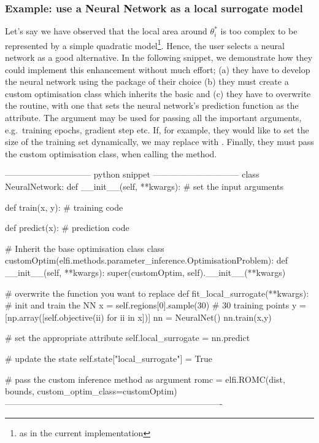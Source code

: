 \subsubsection*{Example: use a Neural Network as a local surrogate model}

Let's say we have observed that the local area around $\theta_i^*$ is
too complex to be represented by a simple quadratic model\footnote{as
  in the current implementation}. Hence, the user selects a neural
network as a good alternative. In the following snippet, we
demonstrate how they could implement this enhancement without much
effort; (a) they have to develop the neural network using the package
of their choice (b) they must create a custom optimisation class which
inherits the basic  and (c) they have to
overwrite the  routine, with one that
sets the neural network's prediction function as the
 attribute. The argument 
may be used for passing all the important arguments, e.g.\ training
epochs, gradient step etc. If, for example, they would like to set the
size of the training set dynamically, we may replace  with . Finally, they must
pass the custom optimisation class, when calling the 
method.

\begin{Code}
------------------------------ python snippet ------------------------------  
  class NeuralNetwork:
      def __init__(self, **kwargs):
          # set the input arguments

      def train(x, y):
          # training code

      def predict(x):
          # prediction code

  # Inherit the base optimisation class
  class customOptim(elfi.methods.parameter_inference.OptimisationProblem):
      def __init__(self, **kwargs):
          super(customOptim, self).__init__(**kwargs)

      # overwrite the function you want to replace
      def fit_local_surrogate(**kwargs):
          # init and train the NN
          x = self.regions[0].sample(30) # 30 training points
          y = [np.array([self.objective(ii) for ii in x])]
          nn = NeuralNet()
          nn.train(x,y)

          # set the appropriate attribute
          self.local_surrogate = nn.predict

          # update the state
          self.state["local_surrogate"] = True

  # pass the custom inference method as argument
  romc = elfi.ROMC(dist, bounds, custom_optim_class=customOptim)
----------------------------------------------------------------------------
\end{Code}

